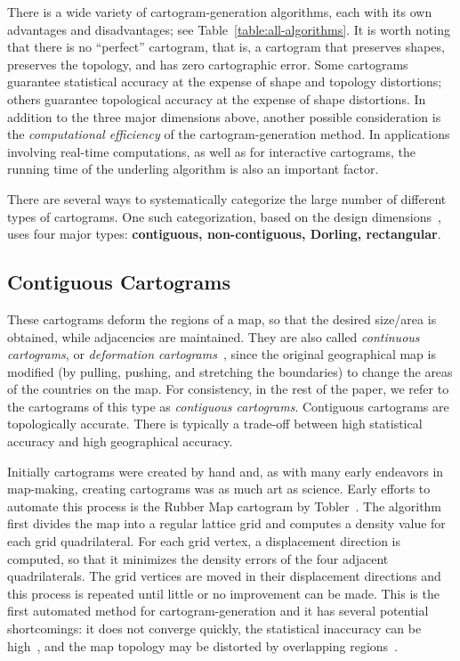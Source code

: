 \documentclass{egpubl}
\begin{document}
There is a wide variety of cartogram-generation algorithms, each with its own advantages and disadvantages; see Table~\ref{table:all-algorithms}.
It is worth noting that there is no ``perfect'' cartogram, that is, a cartogram that preserves shapes, preserves the topology, and has zero cartographic error. Some cartograms guarantee statistical accuracy at the expense of shape and topology distortions; others guarantee topological accuracy at the expense of shape distortions.
In addition to the three major dimensions above, another possible consideration is the {\em computational efficiency} of the cartogram-generation method. In applications involving real-time computations, as well as for interactive cartograms, the running time of the underling algorithm is also an important factor.






There are several ways to systematically categorize the large number of different types of cartograms. 
One such categorization, based on the design dimensions~\cite{ks07}, uses four major types: \textbf{contiguous, non-contiguous, Dorling, rectangular}.




\subsection{Contiguous Cartograms}
These cartograms deform the regions of a map, so that the desired size/area is obtained, while
 adjacencies are maintained. 
They are also called \textit{continuous cartograms}, or \textit{deformation cartograms}~\cite{AKV15}, since the original geographical map is modified (by pulling, pushing, and stretching the boundaries) to change the areas of the countries on the map. 
For consistency, in the rest of the paper, we refer to the cartograms of this type as {\em contiguous cartograms}.  Contiguous cartograms are topologically accurate. There is typically a trade-off between high statistical accuracy and high geographical accuracy.




Initially cartograms were created by hand and, as with many early endeavors in map-making, creating cartograms was as much art as science. Early efforts to automate this process is the Rubber Map cartogram by Tobler~\cite{Tobler73}. 
The algorithm first divides the map into a regular lattice grid and computes a density value for each grid quadrilateral. For each grid vertex, a displacement direction is computed, so that it minimizes the density errors of the four adjacent quadrilaterals. The grid vertices are moved in their displacement directions and this process is repeated until little or no improvement can be made. 
This is the first automated method for cartogram-generation and it has several potential shortcomings:
it does not converge quickly, the statistical inaccuracy can be high~\cite{kocmoud1997constructing}, and the map topology may be distorted by overlapping regions~\cite{GN04}.
\end{document}
